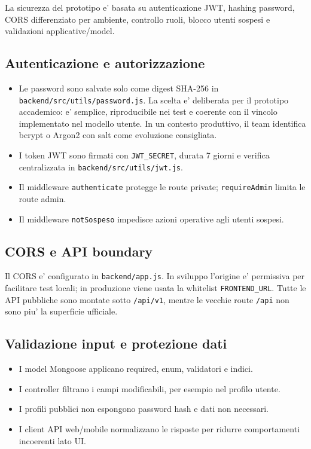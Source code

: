 \documentclass[11pt,a4paper]{article}
\begin{document}
La sicurezza del prototipo e' basata su autenticazione JWT, hashing password, CORS differenziato per ambiente, controllo ruoli, blocco utenti sospesi e validazioni applicative/model.

\subsection*{Autenticazione e autorizzazione}

\begin{itemize}
  \item Le password sono salvate solo come digest SHA-256 in \texttt{backend/src/utils/password.js}. La scelta e' deliberata per il prototipo accademico: e' semplice, riproducibile nei test e coerente con il vincolo implementato nel modello utente. In un contesto produttivo, il team identifica bcrypt o Argon2 con salt come evoluzione consigliata.
  \item I token JWT sono firmati con \texttt{JWT\_SECRET}, durata 7 giorni e verifica centralizzata in \texttt{backend/src/utils/jwt.js}.
  \item Il middleware \texttt{authenticate} protegge le route private; \texttt{requireAdmin} limita le route admin.
  \item Il middleware \texttt{notSospeso} impedisce azioni operative agli utenti sospesi.
\end{itemize}

\subsection*{CORS e API boundary}

Il CORS e' configurato in \texttt{backend/app.js}. In sviluppo l'origine e' permissiva per facilitare test locali; in produzione viene usata la whitelist \texttt{FRONTEND\_URL}. Tutte le API pubbliche sono montate sotto \texttt{/api/v1}, mentre le vecchie route \texttt{/api} non sono piu' la superficie ufficiale.

\subsection*{Validazione input e protezione dati}

\begin{itemize}
  \item I model Mongoose applicano required, enum, validatori e indici.
  \item I controller filtrano i campi modificabili, per esempio nel profilo utente.
  \item I profili pubblici non espongono password hash e dati non necessari.
  \item I client API web/mobile normalizzano le risposte per ridurre comportamenti incoerenti lato UI.
\end{itemize}
\end{document}
